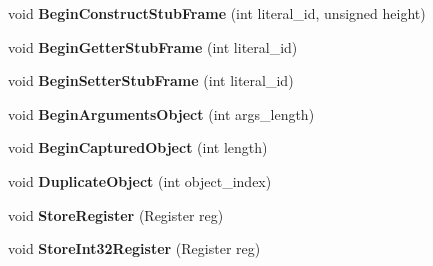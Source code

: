 \begin{DoxyCompactItemize}
\item 
\hypertarget{classv8_1_1internal_1_1_b_a_s_e___e_m_b_e_d_d_e_d_a4cc8d46f743e4fe19c004ec45fa5a1fe}{}void {\bfseries Begin\+Construct\+Stub\+Frame} (int literal\+\_\+id, unsigned height)\label{classv8_1_1internal_1_1_b_a_s_e___e_m_b_e_d_d_e_d_a4cc8d46f743e4fe19c004ec45fa5a1fe}

\item 
\hypertarget{classv8_1_1internal_1_1_b_a_s_e___e_m_b_e_d_d_e_d_a82326287db1eb603eb1b30f6e9b99da4}{}void {\bfseries Begin\+Getter\+Stub\+Frame} (int literal\+\_\+id)\label{classv8_1_1internal_1_1_b_a_s_e___e_m_b_e_d_d_e_d_a82326287db1eb603eb1b30f6e9b99da4}

\item 
\hypertarget{classv8_1_1internal_1_1_b_a_s_e___e_m_b_e_d_d_e_d_ae364bfe39a18dedd281150cad1f2a849}{}void {\bfseries Begin\+Setter\+Stub\+Frame} (int literal\+\_\+id)\label{classv8_1_1internal_1_1_b_a_s_e___e_m_b_e_d_d_e_d_ae364bfe39a18dedd281150cad1f2a849}

\item 
\hypertarget{classv8_1_1internal_1_1_b_a_s_e___e_m_b_e_d_d_e_d_ad642d537743a8dd450bf70527bd9ae25}{}void {\bfseries Begin\+Arguments\+Object} (int args\+\_\+length)\label{classv8_1_1internal_1_1_b_a_s_e___e_m_b_e_d_d_e_d_ad642d537743a8dd450bf70527bd9ae25}

\item 
\hypertarget{classv8_1_1internal_1_1_b_a_s_e___e_m_b_e_d_d_e_d_af2f9e644f32f77d44910dd00cdba1505}{}void {\bfseries Begin\+Captured\+Object} (int length)\label{classv8_1_1internal_1_1_b_a_s_e___e_m_b_e_d_d_e_d_af2f9e644f32f77d44910dd00cdba1505}

\item 
\hypertarget{classv8_1_1internal_1_1_b_a_s_e___e_m_b_e_d_d_e_d_a9a2fe45f576099b407eec4dcc510a61a}{}void {\bfseries Duplicate\+Object} (int object\+\_\+index)\label{classv8_1_1internal_1_1_b_a_s_e___e_m_b_e_d_d_e_d_a9a2fe45f576099b407eec4dcc510a61a}

\item 
\hypertarget{classv8_1_1internal_1_1_b_a_s_e___e_m_b_e_d_d_e_d_a7375e4237ae82bce7be264d48999e382}{}void {\bfseries Store\+Register} (Register reg)\label{classv8_1_1internal_1_1_b_a_s_e___e_m_b_e_d_d_e_d_a7375e4237ae82bce7be264d48999e382}

\item 
\hypertarget{classv8_1_1internal_1_1_b_a_s_e___e_m_b_e_d_d_e_d_a7ec8ba71dc9dfdb7df70be68a4f5aed8}{}void {\bfseries Store\+Int32\+Register} (Register reg)\label{classv8_1_1internal_1_1_b_a_s_e___e_m_b_e_d_d_e_d_a7ec8ba71dc9dfdb7df70be68a4f5aed8}


\end{DoxyCompactItemize}
